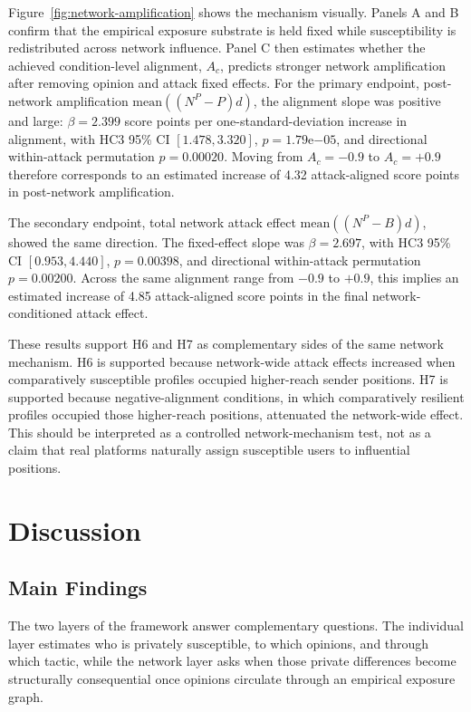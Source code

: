 \documentclass[11pt,a4paper]{article}
\begin{document}
Figure~\ref{fig:network-amplification} shows the mechanism visually. Panels A and B confirm that
the empirical exposure substrate is held fixed while susceptibility is redistributed across
network influence. Panel C then estimates whether the achieved condition-level alignment,
\(A_c\), predicts stronger network amplification after removing opinion and attack fixed effects.
For the primary endpoint, post-network amplification \(\mathrm{mean}((N^P-P)d)\), the alignment
slope was positive and large: \(\beta=2.399\) score points per one-standard-deviation increase in
alignment, with HC3 95\% CI \([1.478,3.320]\), \(p=1.79\mathrm{e}{-05}\), and directional
within-attack permutation \(p=0.00020\). Moving from \(A_c=-0.9\) to \(A_c=+0.9\) therefore
corresponds to an estimated increase of 4.32 attack-aligned score points in post-network
amplification.

The secondary endpoint, total network attack effect \(\mathrm{mean}((N^P-B)d)\), showed the same
direction. The fixed-effect slope was \(\beta=2.697\), with HC3 95\% CI \([0.953,4.440]\),
\(p=0.00398\), and directional within-attack permutation \(p=0.00200\). Across the same alignment
range from \(-0.9\) to \(+0.9\), this implies an estimated increase of 4.85 attack-aligned score
points in the final network-conditioned attack effect.

These results support H6 and H7 as complementary sides of the same network mechanism. H6 is
supported because network-wide attack effects increased when comparatively susceptible profiles
occupied higher-reach sender positions. H7 is supported because negative-alignment conditions, in
which comparatively resilient profiles occupied those higher-reach positions, attenuated the
network-wide effect. This should be interpreted as a controlled network-mechanism test, not as a
claim that real platforms naturally assign susceptible users to influential positions.

\section{Discussion}

\subsection{Main Findings}

The two layers of the framework answer complementary questions. The individual layer estimates who
is privately susceptible, to which opinions, and through which tactic, while the network layer asks
when those private differences become structurally consequential once opinions circulate through an
empirical exposure graph.
\end{document}
